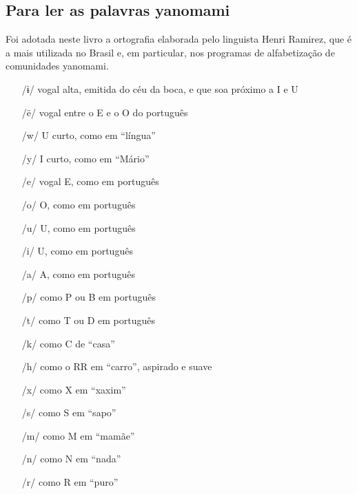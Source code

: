 \subsection{Para ler as palavras yanomami}


Foi adotada neste livro a ortografia elaborada pelo linguista Henri Ramirez, que é a mais utilizada no Brasil e, em particular, nos programas de alfabetização de comunidades yanomami. 

\begin{itemize}
\item[/ɨ/] vogal alta, emitida do céu da boca, e que soa próximo a I e U
\item[/ë/] vogal entre o E e o O do português
\item[/w/] U curto, como em “língua”
\item[/y/] I curto, como em “Mário”
\item[/e/] vogal E, como em português
\item[/o/] O, como em português
\item[/u/] U, como em português
\item[/i/] U, como em português
\item[/a/] A, como em português
\item[/p/] como P ou B em português
\item[/t/] como T ou D em português
\item[/k/] como C de “casa”
\item[/h/] como o RR em “carro”, aspirado e suave
\item[/x/] como X em “xaxim”
\item[/s/] como S em “sapo”
\item[/m/] como M em “mamãe”
\item[/n/] como N em “nada”
\item[/r/] como R em “puro”
\end{itemize}








 

 

 

 

 

 
